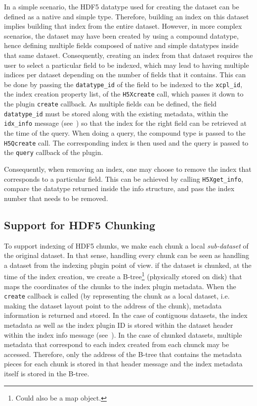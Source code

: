 \documentclass[letterpaper,hyper]{THG_RFC}
\begin{document}
In a simple scenario, the HDF5 datatype used for creating the dataset can be defined
as a native and simple type. Therefore, building an index on this dataset implies
building that index from the entire dataset. However, in more complex scenarios, the
dataset may have been created by using a compound datatype, hence defining
multiple fields composed of native and simple datatypes inside that same dataset.
Consequently, creating an index from that dataset requires the user to select a
particular field to be indexed, which may lead to having multiple indices per dataset
depending on the number of fields that it contains. This can be done by passing
the \texttt{datatype\_id} of the field to be indexed to the \texttt{xcpl\_id},
the index creation property list, of the \texttt{H5Xcreate} call, which passes
it down to the plugin \texttt{create} callback. As multiple fields can be defined,
the field \texttt{datatype\_id} must be stored along with the existing metadata, within the
\texttt{idx\_info} message (see~) so that the index
for the right field can be retrieved at the time of the query.
When doing a query, the compound type is passed to the \texttt{H5Qcreate} call.
The corresponding index is then used and the query is passed to the \texttt{query}
callback of the plugin.

Consequently, when removing an index, one may choose to remove the index that
corresponds to a particular field. This can be achieved by calling \texttt{H5Xget\_info},
compare the datatype returned inside the info structure, and pass the index number
that needs to be removed.

\subsection{Support for HDF5 Chunking}

To support indexing of HDF5 chunks, we make each chunk a local \textit{sub-dataset}
of the original dataset. In that sense, handling every chunk can be seen as handling
a dataset from the indexing plugin point of view. if the dataset is chunked,
at the time of the index creation, we create a B-tree\footnote{Could also
be a map object.} (physically
stored on disk) that maps the coordinates of the chunks to the index plugin metadata.
When the \texttt{create} callback is called (by representing the chunk as
a local dataset, i.e. making the dataset layout point to the address of the chunk),
metadata information is returned and stored.
In the case of contiguous datasets, the index metadata as well as the index plugin ID is
stored within the dataset header within the index info message (see~).
In the case of chunked datasets, multiple metadata that correspond to each index created
from each chunck may be accessed. Therefore, only the address of the B-tree that contains the 
metadata pieces for each chunk is stored in that header message and the index
metadata itself is stored in the B-tree.
\end{document}
